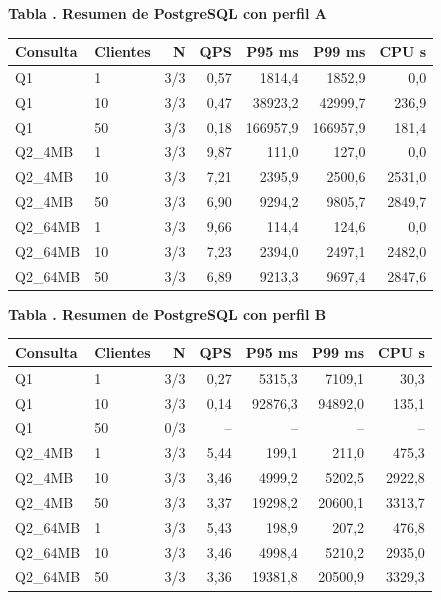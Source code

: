 \documentclass[12pt,letterpaper]{article}
\begin{document}
\par\begin{minipage}{\textwidth}\begin{center}\textbf{Tabla \thetable. Resumen de PostgreSQL con perfil A}\par\small\begin{tabular}{llrrrrr}\toprule Consulta & Clientes & N & QPS & P95 ms & P99 ms & CPU s \\ \midrule
Q1 & 1 & 3/3 & 0,57 & 1814,4 & 1852,9 & 0,0 \\
Q1 & 10 & 3/3 & 0,47 & 38923,2 & 42999,7 & 236,9 \\
Q1 & 50 & 3/3 & 0,18 & 166957,9 & 166957,9 & 181,4 \\
Q2\_4MB & 1 & 3/3 & 9,87 & 111,0 & 127,0 & 0,0 \\
Q2\_4MB & 10 & 3/3 & 7,21 & 2395,9 & 2500,6 & 2531,0 \\
Q2\_4MB & 50 & 3/3 & 6,90 & 9294,2 & 9805,7 & 2849,7 \\
Q2\_64MB & 1 & 3/3 & 9,66 & 114,4 & 124,6 & 0,0 \\
Q2\_64MB & 10 & 3/3 & 7,23 & 2394,0 & 2497,1 & 2482,0 \\
Q2\_64MB & 50 & 3/3 & 6,89 & 9213,3 & 9697,4 & 2847,6 \\
\bottomrule\end{tabular}\end{center}\end{minipage}\par
\par\begin{minipage}{\textwidth}\begin{center}\textbf{Tabla \thetable. Resumen de PostgreSQL con perfil B}\par\small\begin{tabular}{llrrrrr}\toprule Consulta & Clientes & N & QPS & P95 ms & P99 ms & CPU s \\ \midrule
Q1 & 1 & 3/3 & 0,27 & 5315,3 & 7109,1 & 30,3 \\
Q1 & 10 & 3/3 & 0,14 & 92876,3 & 94892,0 & 135,1 \\
Q1 & 50 & 0/3 & -- & -- & -- & -- \\
Q2\_4MB & 1 & 3/3 & 5,44 & 199,1 & 211,0 & 475,3 \\
Q2\_4MB & 10 & 3/3 & 3,46 & 4999,2 & 5202,5 & 2922,8 \\
Q2\_4MB & 50 & 3/3 & 3,37 & 19298,2 & 20600,1 & 3313,7 \\
Q2\_64MB & 1 & 3/3 & 5,43 & 198,9 & 207,2 & 476,8 \\
Q2\_64MB & 10 & 3/3 & 3,46 & 4998,4 & 5210,2 & 2935,0 \\
Q2\_64MB & 50 & 3/3 & 3,36 & 19381,8 & 20500,9 & 3329,3 \\
\bottomrule\end{tabular}\end{center}\end{minipage}\par
\end{document}
